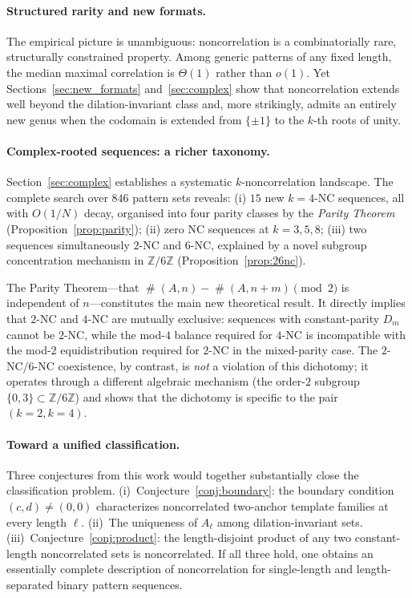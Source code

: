 \documentclass[11pt]{article}
\theoremstyle{definition}
\DeclareMathOperator{\occ}{\#}
\newcommand{\Z}{\mathbb{Z}}
\begin{document}
\paragraph{Structured rarity and new formats.}
The empirical picture is unambiguous: noncorrelation is a
combinatorially rare, structurally constrained property. Among generic
patterns of any fixed length, the median maximal correlation is
$\Theta(1)$ rather than $o(1)$. Yet Sections~\ref{sec:new_formats}
and~\ref{sec:complex} show that noncorrelation extends well beyond
the dilation-invariant class and, more strikingly, admits an entirely
new genus when the codomain is extended from $\{\pm1\}$ to the
$k$-th roots of unity.

\paragraph{Complex-rooted sequences: a richer taxonomy.}
Section~\ref{sec:complex} establishes a systematic $k$-noncorrelation
landscape.  The complete search over $846$ pattern sets reveals:
(i) $15$ new $k=4$-NC sequences, all with $O(1/N)$ decay, organised
into four parity classes by the \emph{Parity Theorem}
(Proposition~\ref{prop:parity}); (ii) zero NC sequences at $k = 3, 5,
8$; (iii) two sequences simultaneously $2$-NC and $6$-NC, explained
by a novel subgroup concentration mechanism in $\Z/6\Z$
(Proposition~\ref{prop:26nc}).

The Parity Theorem---that $\occ(A,n) - \occ(A,n+m) \pmod 2$ is
independent of $n$---constitutes the main new theoretical result.
It directly implies that $2$-NC and $4$-NC are mutually exclusive:
sequences with constant-parity $D_m$ cannot be $2$-NC, while the
mod-$4$ balance required for $4$-NC is incompatible with the mod-$2$
equidistribution required for $2$-NC in the mixed-parity case.
The $2$-NC/$6$-NC coexistence, by contrast, is \emph{not} a
violation of this dichotomy; it operates through a different
algebraic mechanism (the order-$2$ subgroup $\{0,3\} \subset \Z/6\Z$)
and shows that the dichotomy is specific to the pair $(k=2, k=4)$.

\paragraph{Toward a unified classification.}
Three conjectures from this work would together substantially close the
classification problem. (i)~Conjecture~\ref{conj:boundary}: the
boundary condition $(c,d) \neq (0,0)$ characterizes noncorrelated
two-anchor template families at every length $\ell$. (ii)~The
uniqueness of $A_\ell$ among dilation-invariant sets. (iii)~Conjecture~\ref{conj:product}: the length-disjoint product of any
two constant-length noncorrelated sets is noncorrelated. If all three
hold, one obtains an essentially complete description of noncorrelation
for single-length and length-separated binary pattern sequences.
\end{document}
